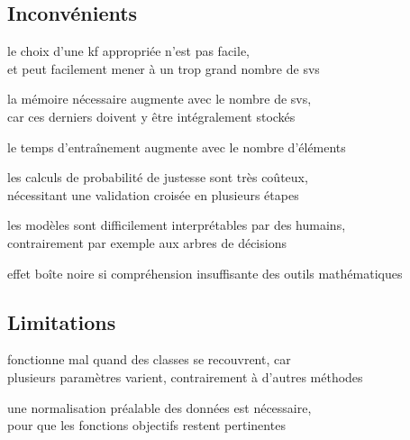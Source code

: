 \subsection{Inconvénients}

\begin{itmz}
\item{le choix d’une \gls{kf} appropriée n’est pas facile,\\
et peut facilement mener à un trop grand nombre de \glspl{sv}}
\item{la mémoire nécessaire augmente avec le nombre de \glspl{sv},\\
car ces derniers doivent y être intégralement stockés}
\item{le temps d’entraînement augmente avec le nombre d’éléments}
\item{les calculs de probabilité de justesse sont très coûteux,\\
nécessitant une validation croisée en plusieurs étapes}
\item{les modèles sont difficilement interprétables par des humains,\\
contrairement par exemple aux arbres de décisions}
\item{effet boîte noire si compréhension insuffisante des outils mathématiques}
\end{itmz}

\subsection{Limitations}

\begin{itmz}
\item{fonctionne mal quand des classes se recouvrent, car\\
plusieurs paramètres varient, contrairement à d’autres méthodes}
\item{une normalisation préalable des données est nécessaire,\\
pour que les fonctions objectifs restent pertinentes}
\end{itmz}

\pagebreak
